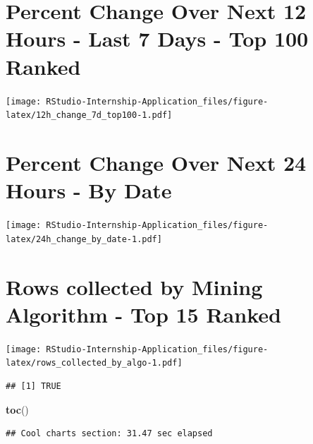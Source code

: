 \documentclass[
]{book}
\newenvironment{Shaded}{\begin{snugshade}}{\end{snugshade}}
\newcommand{\KeywordTok}[1]{\textcolor[rgb]{0.13,0.29,0.53}{\textbf{#1}}}
\newcommand{\NormalTok}[1]{#1}
\begin{document}
\hypertarget{percent-change-over-next-12-hours---last-7-days---top-100-ranked}{%
\section{Percent Change Over Next 12 Hours - Last 7 Days - Top 100 Ranked}\label{percent-change-over-next-12-hours---last-7-days---top-100-ranked}}

\texttt{[image: RStudio-Internship-Application\_files/figure-latex/12h\_change\_7d\_top100-1.pdf]}

\hypertarget{percent-change-over-next-24-hours---by-date}{%
\section{Percent Change Over Next 24 Hours - By Date}\label{percent-change-over-next-24-hours---by-date}}

\texttt{[image: RStudio-Internship-Application\_files/figure-latex/24h\_change\_by\_date-1.pdf]}

\hypertarget{rows-collected-by-mining-algorithm---top-15-ranked}{%
\section{Rows collected by Mining Algorithm - Top 15 Ranked}\label{rows-collected-by-mining-algorithm---top-15-ranked}}

\texttt{[image: RStudio-Internship-Application\_files/figure-latex/rows\_collected\_by\_algo-1.pdf]}

\begin{verbatim}
## [1] TRUE
\end{verbatim}

\begin{Shaded}
\begin{Highlighting}[]
\KeywordTok{toc}\NormalTok{()}
\end{Highlighting}
\end{Shaded}

\begin{verbatim}
## Cool charts section: 31.47 sec elapsed
\end{verbatim}

  
\end{document}
